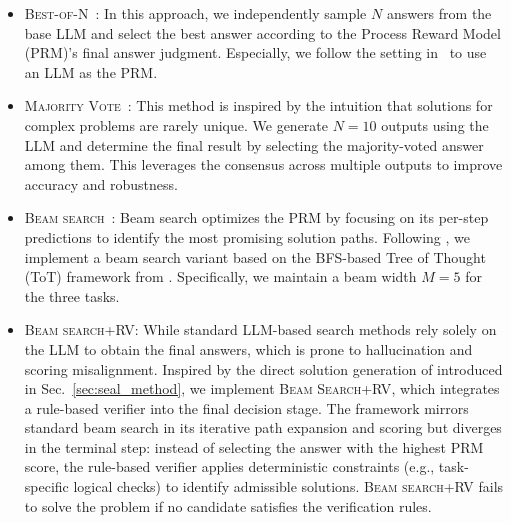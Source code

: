\begin{itemize}[leftmargin=*]
    \item \textsc{Best-of-N}~\cite{snell2024scaling}: In this approach, we independently sample $N$ answers from the base LLM and select the best answer according to the Process Reward Model (PRM)'s final answer judgment. Especially, we follow the setting in~\cite{yao2023tree,hao2023reasoning,lightman2023let} to use an LLM as the PRM. 
    \item \textsc{Majority Vote}~\cite{wang2023selfconsistency}: This method is inspired by the intuition that solutions for complex problems are rarely unique. We generate $N=10$ outputs using the LLM and determine the final result by selecting the majority-voted answer among them. This leverages the consensus across multiple outputs to improve accuracy and robustness.
    \item \textsc{Beam search}~\cite{yao2023tree}: Beam search optimizes the PRM by focusing on its per-step predictions to identify the most promising solution paths. Following \cite{snell2024scaling}, we implement a beam search variant based on the BFS-based Tree of Thought (ToT) framework from \cite{yao2023tree}. Specifically, we maintain a beam width  $M=5$ for the three tasks. 
    \item \textsc{Beam search+RV}: 
    While standard LLM-based search methods rely solely on the LLM to obtain the final answers, which is prone to hallucination and scoring misalignment. Inspired by the direct solution generation of \method introduced in Sec.~\ref{sec:seal_method}, we implement \textsc{Beam Search+RV}, which integrates a rule-based verifier into the final decision stage. The framework mirrors standard beam search in its iterative path expansion and scoring but diverges in the terminal step: instead of selecting the answer with the highest PRM score, the rule-based verifier applies deterministic constraints (e.g., task-specific logical checks) to identify admissible solutions. \textsc{Beam search+RV} fails to solve the problem if no candidate satisfies the verification rules.
\end{itemize}

